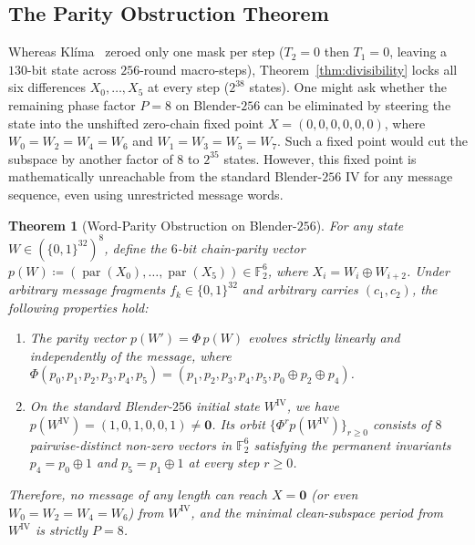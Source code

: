 \documentclass[11pt,a4paper]{article}
\newtheorem{theorem}{Theorem}
\theoremstyle{definition}
\theoremstyle{remark}
\newcommand{\Ftwo}{\mathbb{F}_2}
\newcommand{\parop}{\operatorname{par}}
\begin{document}
\subsection{The Parity Obstruction Theorem}
\label{subsec:parity-obstruction}
Whereas Kl\'{i}ma~\cite{Kli09} zeroed only one mask per step ($T_2 = 0$ then $T_1 = 0$, leaving a $130$-bit state across $256$-round macro-steps), Theorem~\ref{thm:divisibility} locks all six differences $X_0, \dots, X_5$ at every step ($2^{38}$ states). One might ask whether the remaining phase factor $P = 8$ on Blender-$256$ can be eliminated by steering the state into the unshifted zero-chain fixed point $X = (0,0,0,0,0,0)$, where $W_0 = W_2 = W_4 = W_6$ and $W_1 = W_3 = W_5 = W_7$. Such a fixed point would cut the subspace by another factor of $8$ to $2^{35}$ states. However, this fixed point is mathematically unreachable from the standard Blender-$256$ IV for any message sequence, even using unrestricted message words.

\begin{theorem}[Word-Parity Obstruction on Blender-$256$]
\label{thm:parity-obstruction}
For any state $W \in (\{0,1\}^{32})^8$, define the $6$-bit chain-parity vector $p(W) \coloneqq (\parop(X_0), \dots, \parop(X_5)) \in \Ftwo^6$, where $X_i = W_i \oplus W_{i+2}$. Under arbitrary message fragments $f_k \in \{0,1\}^{32}$ and arbitrary carries $(c_1, c_2)$, the following properties hold:
\begin{enumerate}[leftmargin=2em]
    \item The parity vector $p(W') = \Phi\,p(W)$ evolves strictly linearly and independently of the message, where $\Phi(p_0, p_1, p_2, p_3, p_4, p_5) = (p_1, p_2, p_3, p_4, p_5, p_0 \oplus p_2 \oplus p_4)$.
    \item On the standard Blender-$256$ initial state $W^{\mathrm{IV}}$, we have $p(W^{\mathrm{IV}}) = (1, 0, 1, 0, 0, 1) \neq \mathbf{0}$. Its orbit $\{\Phi^r p(W^{\mathrm{IV}})\}_{r \ge 0}$ consists of $8$ pairwise-distinct non-zero vectors in $\Ftwo^6$ satisfying the permanent invariants $p_4 = p_0 \oplus 1$ and $p_5 = p_1 \oplus 1$ at every step $r \ge 0$.
\end{enumerate}
Therefore, no message of any length can reach $X = \mathbf{0}$ (or even $W_0 = W_2 = W_4 = W_6$) from $W^{\mathrm{IV}}$, and the minimal clean-subspace period from $W^{\mathrm{IV}}$ is strictly $P = 8$.
\end{theorem}
\end{document}
